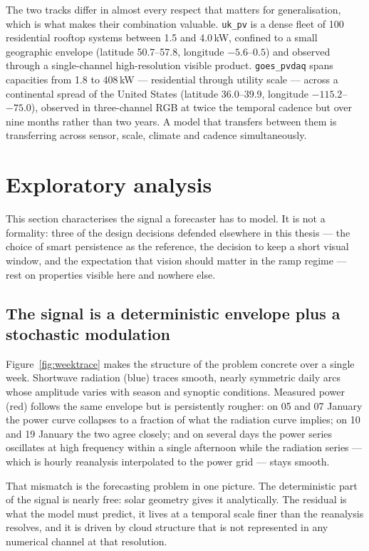 The two tracks differ in almost every respect that matters for generalisation, which is
what makes their combination valuable. \texttt{uk\_pv} is a dense fleet of 100 residential
rooftop systems between 1.5 and 4.0\,kW, confined to a small geographic envelope (latitude
50.7--57.8, longitude $-5.6$--$0.5$) and observed through a single-channel high-resolution
visible product. \texttt{goes\_pvdaq} spans capacities from 1.8 to 408\,kW --- residential
through utility scale --- across a continental spread of the United States (latitude
36.0--39.9, longitude $-115.2$--$-75.0$), observed in three-channel RGB at twice the
temporal cadence but over nine months rather than two years. A model that transfers between
them is transferring across sensor, scale, climate and cadence simultaneously.

\section{Exploratory analysis}
\label{sec:eda}

This section characterises the signal a forecaster has to model. It is not a formality: three
of the design decisions defended elsewhere in this thesis --- the choice of smart persistence
as the reference, the decision to keep a short visual window, and the expectation that vision
should matter in the ramp regime --- rest on properties visible here and nowhere else.

\subsection{The signal is a deterministic envelope plus a stochastic modulation}

Figure~\ref{fig:weektrace} makes the structure of the problem concrete over a single week.
Shortwave radiation (blue) traces smooth, nearly symmetric daily arcs whose amplitude varies
with season and synoptic conditions. Measured power (red) follows the same envelope but is
persistently rougher: on 05 and 07 January the power curve collapses to a fraction of what
the radiation curve implies; on 10 and 19 January the two agree closely; and on several days
the power series oscillates at high frequency within a single afternoon while the radiation
series --- which is hourly reanalysis interpolated to the power grid --- stays smooth.

That mismatch is the forecasting problem in one picture. The deterministic part of the signal
is nearly free: solar geometry gives it analytically. The residual is what the model must
predict, it lives at a temporal scale finer than the reanalysis resolves, and it is driven by
cloud structure that is not represented in any numerical channel at that resolution.

